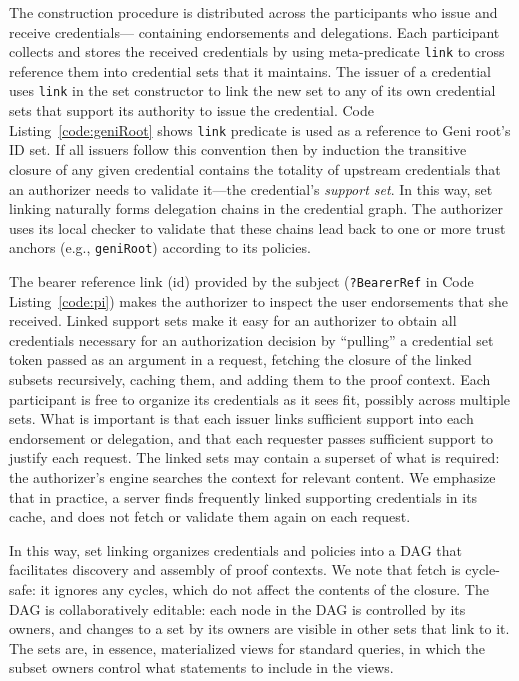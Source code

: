 {The construction procedure is distributed across the participants who issue and
receive credentials--- containing endorsements and delegations. Each
participant collects and stores the received credentials by using
meta-predicate {\tt link} to cross reference them into credential sets that it maintains.
The issuer of a credential uses {\tt link} in the set constructor to link the
new set to any of its own credential sets that support its authority to issue
the credential. Code Listing~\ref{code:geniRoot} shows {\tt link} predicate is
used as a reference to Geni root's ID set. If all issuers follow this convention
then by induction the transitive closure of any given credential contains the
totality of upstream credentials that an authorizer needs to validate it---the
credential's {\it support set}. In this way, set linking naturally forms
delegation chains in the credential graph. The authorizer uses its local
checker to validate that these chains lead back to one or more trust anchors
(e.g., {\tt geniRoot}) according to its policies.

The bearer reference link (id) provided by the subject ({\tt ?BearerRef} in
Code Listing~\ref{code:pi}) makes the authorizer to inspect the user
endorsements that she received. Linked support sets make it easy for an
authorizer to obtain all credentials necessary for an authorization decision by
``pulling'' a credential set token passed as an argument in a request, fetching
the closure of the linked subsets recursively, caching them, and adding them to
the proof context. Each participant is free to organize its credentials as it
sees fit, possibly across multiple sets. What is important is that each issuer
links sufficient support into each endorsement or delegation, and that each
requester passes sufficient support to justify each request. The linked sets
may contain a superset of what is required: the authorizer's 
engine searches the context for relevant content. We emphasize that in
practice, a server finds frequently linked supporting credentials in its cache,
and does not fetch or validate them again on each request. 

In this way, set linking organizes credentials and policies into a DAG that
facilitates discovery and assembly of proof contexts. We note that fetch is
cycle-safe: it ignores any cycles, which do not affect the contents of the
closure.  The DAG is collaboratively editable: each node in the DAG is
controlled by its owners, and changes to a set by its owners are visible in
other sets that link to it. The sets are, in essence, materialized views for
standard queries, in which the subset owners control what statements to include
in the views.

}
